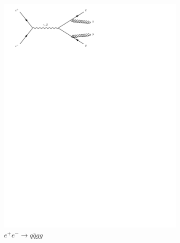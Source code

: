 \begin{figure}[h]
  \centering
  \begin{subfigure}[b]{0.3\textwidth}
    \includegraphics[trim={0.5cm 22cm 10cm 0cm},width=\textwidth]{../Diagrams/D1.pdf}
    \caption{$e^+e^- \rightarrow q\bar{q}gg$}
    \label{fey:1}
  \end{subfigure}%
  ~
  \begin{subfigure}[b]{0.3\textwidth}

\end{subfigure}
\end{figure}
